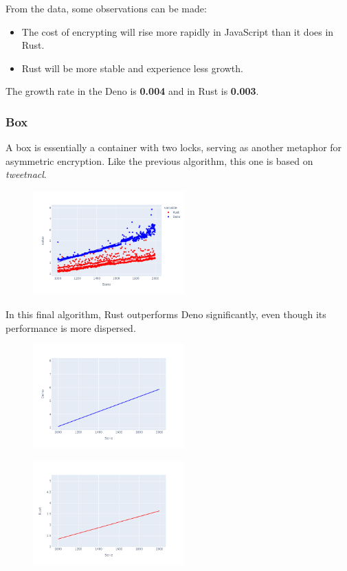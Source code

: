 \documentclass[10pt,journal,compsoc]{IEEEtran}
\begin{document}
From the data, some observations can be made:
\begin{itemize}
    \item The cost of encrypting will rise more rapidly in JavaScript than it does in Rust.
    \item Rust will be more stable and experience less growth.
\end{itemize}

The growth rate in the Deno is \textbf{0.004} and in Rust is \textbf{0.003}.

\subsubsection{Box}

A box is essentially a container with two locks, serving as another metaphor for asymmetric encryption. Like the previous algorithm, this one is based on \textit{tweetnacl}.

\begin{figure}[H]
    \centering
    \includegraphics[width=0.52\textwidth]{images/box_lines}
\end{figure}

In this final algorithm, Rust outperforms Deno significantly, even though its performance is more dispersed.

\begin{figure}[H]
    \centering
    \includegraphics[width=0.52\textwidth]{trend_box_deno}
\end{figure}

\begin{figure}[H]
    \centering
    \includegraphics[width=0.52\textwidth]{images/trend_box_rust}
\end{figure}
\end{document}
